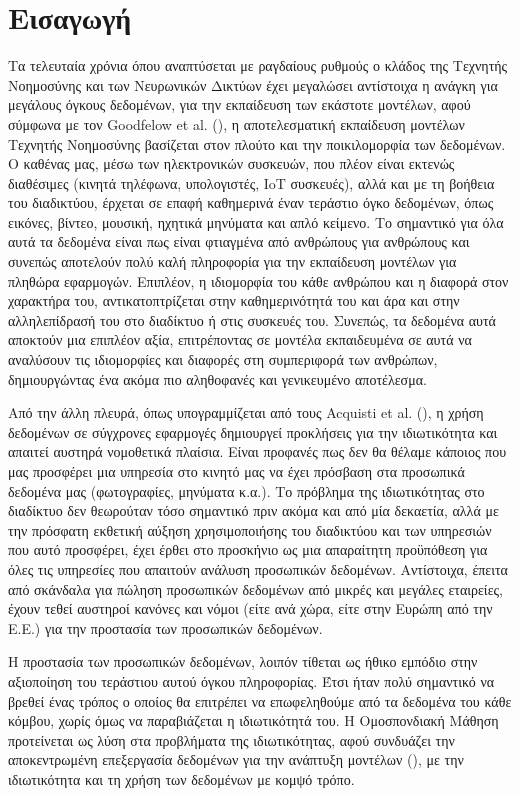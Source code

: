 \chapter{Εισαγωγή}

Τα τελευταία χρόνια όπου αναπτύσεται με ραγδαίους ρυθμούς ο κλάδος της Τεχνητής Νοημοσύνης και των Νευρωνικών Δικτύων έχει μεγαλώσει αντίστοιχα η ανάγκη για μεγάλους όγκους δεδομένων, για την εκπαίδευση των εκάστοτε μοντέλων, αφού σύμφωνα με τον Goodfelow et al. (), η αποτελεσματική εκπαίδευση μοντέλων Τεχνητής Νοημοσύνης βασίζεται στον πλούτο και την ποικιλομορφία των δεδομένων. Ο καθένας μας, μέσω των ηλεκτρονικών συσκευών, που πλέον είναι εκτενώς διαθέσιμες (κινητά τηλέφωνα, υπολογιστές, IoT συσκευές), αλλά και με τη βοήθεια του διαδικτύου, έρχεται σε επαφή καθημερινά έναν τεράστιο όγκο δεδομένων, όπως εικόνες, βίντεο, μουσική, ηχητικά μηνύματα και απλό κείμενο. Το σημαντικό για όλα αυτά τα δεδομένα είναι πως είναι φτιαγμένα από ανθρώπους για ανθρώπους και συνεπώς αποτελούν πολύ καλή πληροφορία για την εκπαίδευση μοντέλων για πληθώρα εφαρμογών. Επιπλέον, η ιδιομορφία του κάθε ανθρώπου και η διαφορά στον χαρακτήρα του, αντικατοπτρίζεται στην καθημερινότητά του και άρα και στην αλληλεπίδρασή του στο διαδίκτυο ή στις συσκευές του. Συνεπώς, τα δεδομένα αυτά αποκτούν μια επιπλέον αξία, επιτρέποντας σε μοντέλα εκπαιδευμένα σε αυτά να αναλύσουν τις ιδιομορφίες και διαφορές στη συμπεριφορά των ανθρώπων, δημιουργώντας ένα ακόμα πιο αληθοφανές και γενικευμένο αποτέλεσμα. 

Από την άλλη πλευρά, όπως υπογραμμίζεται από τους Acquisti et al. (), η χρήση δεδομένων σε σύγχρονες εφαρμογές δημιουργεί προκλήσεις για την ιδιωτικότητα και απαιτεί αυστηρά νομοθετικά πλαίσια. Είναι προφανές πως δεν θα θέλαμε κάποιος που μας προσφέρει μια υπηρεσία στο κινητό μας να έχει πρόσβαση στα προσωπικά δεδομένα μας (φωτογραφίες, μηνύματα κ.α.). Το πρόβλημα της ιδιωτικότητας στο διαδίκτυο δεν θεωρούταν τόσο σημαντικό πριν ακόμα και από μία δεκαετία, αλλά με την πρόσφατη εκθετική αύξηση χρησιμοποιήσης του διαδικτύου και των υπηρεσιών που αυτό προσφέρει, έχει έρθει στο προσκήνιο ως μια απαραίτητη προϋπόθεση για όλες τις υπηρεσίες που απαιτούν ανάλυση προσωπικών δεδομένων. Αντίστοιχα, έπειτα από σκάνδαλα για πώληση προσωπικών δεδομένων από μικρές και μεγάλες εταιρείες, έχουν τεθεί αυστηροί κανόνες και νόμοι (είτε ανά χώρα, είτε στην Ευρώπη από την Ε.Ε.) για την προστασία των προσωπικών δεδομένων.

Η προστασία των προσωπικών δεδομένων, λοιπόν τίθεται ως ήθικο εμπόδιο στην αξιοποίηση του τεράστιου αυτού όγκου πληροφορίας. Έτσι ήταν πολύ σημαντικό να βρεθεί ένας τρόπος ο οποίος θα επιτρέπει να επωφεληθούμε από τα δεδομένα του κάθε κόμβου, χωρίς όμως να παραβιάζεται η ιδιωτικότητά του. Η Ομοσπονδιακή Μάθηση προτείνεται ως λύση στα προβλήματα της ιδιωτικότητας, αφού συνδυάζει την αποκεντρωμένη επεξεργασία δεδομένων για την ανάπτυξη μοντέλων (), με την ιδιωτικότητα και τη χρήση των δεδομένων με κομψό τρόπο.

